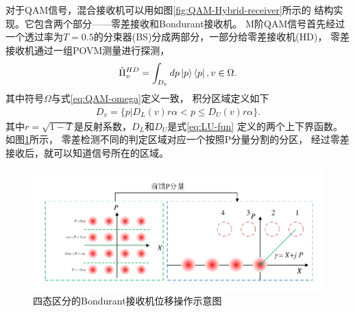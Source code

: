 对于QAM信号，混合接收机可以用如图\ref{fig:QAM-Hybrid-receiver}所示的
结构实现。它包含两个部分——零差接收和Bondurant接收机。
M阶QAM信号首先经过一个透过率为$T=0.5$的分束器(BS)分成两部分，一部分给零差接收机(HD)，
零差接收机通过一组POVM测量进行探测，
\begin{equation}
\hat{\Pi}_v^{HD} = \int_{D_v} dp \ket{p}\bra{p}, v\in \Omega.
\end{equation}
其中符号$\Omega$与式\ref{eq:QAM-omega}定义一致，
积分区域定义如下
\begin{equation}
\begin{split}
D_v = \{p| D_L(v)r\alpha < p \le D_U(v) r\alpha\}.
\end{split}
\end{equation}
其中$r=\sqrt{1-T}$是反射系数，$D_L$和$D_U$是式\ref{eq:LU-fun}
定义的两个上下界函数。
如图\ref{fig:Q-Bondurant-displacemet}所示，
零差检测不同的判定区域对应一个按照P分量分割的分区，
经过零差接收后，就可以知道信号所在的区域。


\begin{figure}
\centering
  \includegraphics[width=\textwidth]{figures/chap3/Q-Bondurant-displacemet}
  \caption{四态区分的Bondurant接收机位移操作示意图}
  \label{fig:Q-Bondurant-displacemet}
\end{figure}

